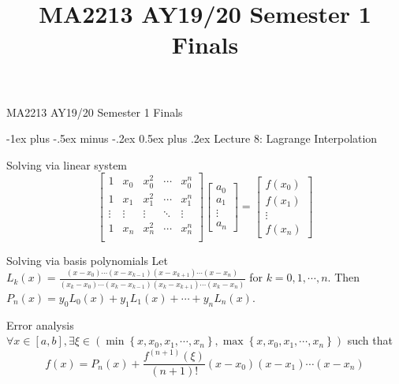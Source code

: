 \documentclass[10pt,landscape]{article}
\title{MA2213 AY19/20 Semester 1 Finals}
\makeatletter
\renewcommand{\section}{\@startsection{section}{1}{0mm}%
                                {-1ex plus -.5ex minus -.2ex}%
                                {0.5ex plus .2ex}%
                                {\normalfont\large\bfseries}}
\theoremstyle{definition}
\newcommand{\thistheoremname}{}
\newtheorem*{genericthm*}{\thistheoremname}
\newenvironment{namedthm*}[1]
{\renewcommand{\thistheoremname}{#1}\begin{genericthm*}}
{\end{genericthm*}}
\makeatother
\begin{document}
\begin{center}
	{\large MA2213 AY19/20 Semester 1 Finals}
\end{center}

\raggedright
\footnotesize

\begin{multicols}{3}

	\setlength{\premulticols}{1pt}
	\setlength{\postmulticols}{1pt}
	\setlength{\multicolsep}{1pt}
	\setlength{\columnsep}{2pt}

	\section{Lecture 8: Lagrange Interpolation}
	\begin{namedthm*}{Solving via linear system} \label{ge}
		\[\begin{bmatrix}
				1      & x_0    & x_0^2  & \cdots & x_0^n  \\
				1      & x_1    & x_1^2  & \cdots & x_1^n  \\
				\vdots & \vdots & \vdots & \ddots & \vdots \\
				1      & x_n    & x_n^2  & \cdots & x_n^n  \\
			\end{bmatrix}
			\begin{bmatrix}
				a_0    \\
				a_1    \\
				\vdots \\
				a_n
			\end{bmatrix}
			=
			\begin{bmatrix}
				f(x_0) \\
				f(x_1) \\
				\vdots \\
				f(x_n)
			\end{bmatrix}
		\]
	\end{namedthm*}

	\begin{namedthm*}{Solving via basis polynomials} Let
		\(L_{k}(x)=\frac{\left(x-x_{0}\right) \cdots\left(x-x_{k-1}\right)\left(x-x_{k+1}\right) \cdots\left(x-x_{n}\right)}{\left(x_{k}-x_{0}\right) \cdots\left(x_{k}-x_{k-1}\right)\left(x_{k}-x_{k+1}\right) \cdots\left(x_{k}-x_{n}\right)}\) for \(k=0,1, \cdots, n\). Then \(P_{n}(x)=y_{0} L_{0}(x)+y_{1} L_{1}(x)+\cdots+y_{n} L_{n}(x)\).
	\end{namedthm*}

	\begin{namedthm*}{Error analysis}
		\(\forall x \in[a, b], \exists \xi \in\left(\min \left\{x, x_{0}, x_{1}, \cdots, x_{n}\right\}, \max \left\{x, x_{0}, x_{1}, \cdots, x_{n}\right\}\right)\) such that
		\[
			f(x)=P_{n}(x)+\frac{f^{(n+1)}(\xi)}{(n+1) !}\left(x-x_{0}\right)\left(x-x_{1}\right) \cdots\left(x-x_{n}\right)
		\]
	\end{namedthm*}

\end{multicols}
\end{document}
